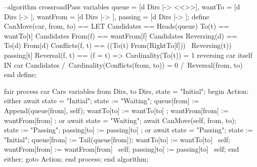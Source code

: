 \documentclass[14pt, openany]{report}
\begin{document}
\begin{ppcal}
--algorithm crossroadPass
variables
  queue = [d \in Dirs |-> <<>>],
  wantTo = [d \in Dirs |-> {}],
  wantFrom = [d \in Dirs |-> {}],
  passing = [d \in Dirs |-> {}];
define
  CanMove(car, from, to) == 
    LET
      Candidates == Heads(queue)
      To(t) == wantTo[t] \intersect Candidates
      From(f) == wantFrom[f] \intersect Candidates
      Reversing(d) == To(d) \intersect From(d) 
      Conflicts(f, t) == ((To(t) \intersect From(RightTo[f])) \ Reversing(t)) \union passing[t]
      Reversal(f, t) == (f = t) => Cardinality(To(t)) = 1 \* reversing car itself
    IN
    car \in Candidates /\
    Cardinality(Conflicts(from, to)) = 0 /\
    Reversal(from, to)
end define;

fair process car \in Cars
variables
  from \in Dirs, to \in Dirs, state = "Initial";
begin
  Action:
    either
      await state = "Initial";
      state := "Waiting";
      queue[from] := Append(queue[from], self);
      wantTo[to] := wantTo[to] ;
      wantFrom[from] := wantFrom[from] ;
    or
      await state = "Waiting";
      await CanMove(self, from, to);
      state := "Passing";
      passing[to] := passing[to] ;
    or
      await state = "Passing";
      state := "Initial";
      queue[from] := Tail(queue[from]);
      wantTo[to] := wantTo[to] \ {self};
      wantFrom[from] := wantFrom[from] \ {self};
      passing[to] := passing[to] \ {self};
    end either;
    goto Action;
end process;
end algorithm;
\end{ppcal}
\end{document}
